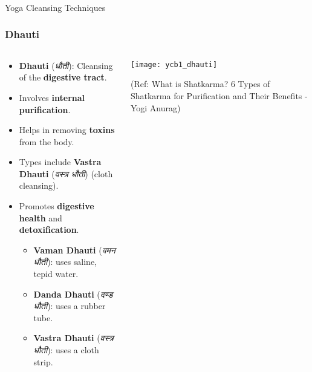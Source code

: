 

\begin{frame}[fragile]\frametitle{}
\begin{center}
{\Large Yoga Cleansing Techniques}
\end{center}
\end{frame}

\begin{frame}[fragile]\frametitle{Dhauti}
\begin{columns}
    \begin{column}[T]{0.5\linewidth}
      \begin{itemize}
        \item \textbf{Dhauti} (\textit{धौती}): Cleansing of the \textbf{digestive tract}.
        \item Involves \textbf{internal purification}.
        \item Helps in removing \textbf{toxins} from the body.
        \item Types include \textbf{Vastra Dhauti} (\textit{वस्त्र धौती}) (cloth cleansing).
        \item Promotes \textbf{digestive health} and \textbf{detoxification}.
		\begin{itemize}
		  \item \textbf{Vaman Dhauti} (\textit{वमन धौती}): uses saline, tepid water.
		  \item \textbf{Danda Dhauti} (\textit{दण्ड धौती}): uses a rubber tube.
		  \item \textbf{Vastra Dhauti} (\textit{वस्त्र धौती}): uses a cloth strip.
		\end{itemize}		
      \end{itemize}
    \end{column}
    \begin{column}[T]{0.5\linewidth}
        \begin{center}
        \texttt{[image: ycb1\_dhauti]}
		
		{\tiny (Ref: What is Shatkarma? 6 Types of Shatkarma for Purification and Their Benefits - Yogi Anurag)}	
        \end{center}	
    \end{column}
\end{columns}
\end{frame}


